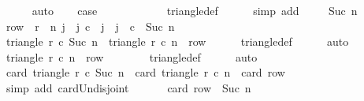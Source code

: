 \begin{isabellebody}
\ \ \ \ \isamarkupfalse%
\ auto\isanewline
\ \ \isamarkupfalse%
\ {\isacharquery}case\isanewline
\ \ \ \ \isamarkupfalse%
\ {}\isanewline
\ \ \ \ \isamarkupfalse%
\ triangle{\isacharunderscore}def\isanewline
\ \ \ \ \isamarkupfalse%
\ {\isacharparenleft}simp\ add{\isacharcolon}\ {\isacharasterisk}{\isacharparenright}\isanewline
{}\isamarkupfalse%
\isanewline
\ \ \isamarkupfalse%
\ {\isacharparenleft}Suc\ n{\isacharparenright}\isanewline
\ \ \isamarkupfalse%
\ {\isacharquery}row\ {\isacharequal}\ {\isachardoublequoteopen}{\isacharbraceleft}{\isacharparenleft}r{}\ {\isacharplus}\ n{\isacharcomma}\ j{\isacharparenright}\ {\isacharbar}\ j{\isachardot}\ c{}\ {\isasymle}\ j\ {\isasymand}\ j\ {\isacharless}\ c{}\ {\isacharplus}\ Suc\ n{\isacharbraceright}{\isachardoublequoteclose}\isanewline
\ \ \isamarkupfalse%
\ {\isachardoublequoteopen}triangle\ r{}\ c{}\ {\isacharparenleft}Suc\ n{\isacharparenright}\ {\isacharequal}\ triangle\ r{}\ c{}\ n\ {\isasymunion}\ {\isacharquery}row{\isachardoublequoteclose}\isanewline
\ \ \ \ \isamarkupfalse%
\ triangle{\isacharunderscore}def\isanewline
\ \ \ \ \isamarkupfalse%
\ auto\isanewline
\ \ \isamarkupfalse%
\isanewline
\ \ \isamarkupfalse%
\ {\isachardoublequoteopen}triangle\ r{}\ c{}\ n\ {\isasyminter}\ {\isacharquery}row\ {\isacharequal}\ {\isacharbraceleft}{\isacharbraceright}{\isachardoublequoteclose}\isanewline
\ \ \ \ \isamarkupfalse%
\ triangle{\isacharunderscore}def\isanewline
\ \ \ \ \isamarkupfalse%
\ auto\isanewline
\ \ \isamarkupfalse%
\isanewline
\ \ \isamarkupfalse%
\ {\isachardoublequoteopen}card\ {\isacharparenleft}triangle\ r{}\ c{}\ {\isacharparenleft}Suc\ n{\isacharparenright}{\isacharparenright}\ {\isacharequal}\ card\ {\isacharparenleft}triangle\ r{}\ c{}\ n{\isacharparenright}\ {\isacharplus}\ card\ {\isacharquery}row{\isachardoublequoteclose}\isanewline
\ \ \ \ \isamarkupfalse%
\ {\isacharparenleft}simp\ add{\isacharcolon}\ card{\isacharunderscore}Un{\isacharunderscore}disjoint{\isacharparenright}\isanewline
\ \ \isamarkupfalse%
\isanewline
\ \ \isamarkupfalse%
\ {\isachardoublequoteopen}card\ {\isacharquery}row\ {\isacharequal}\ Suc\ n{\isachardoublequoteclose}\isanewline

\end{isabellebody}
